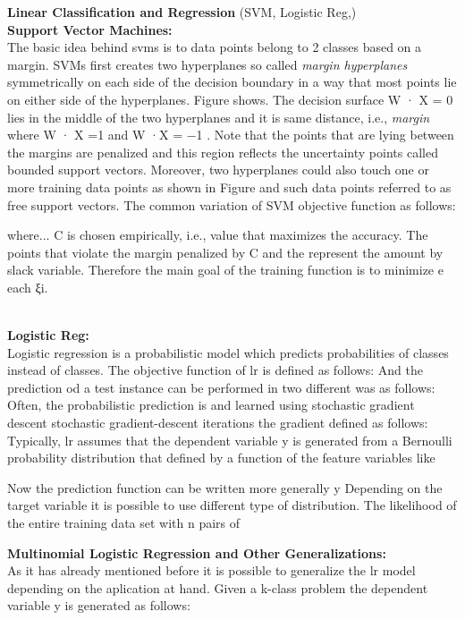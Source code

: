 \textbf{Linear Classification and Regression} (SVM, Logistic Reg,)\\
\textbf{Support Vector Machines:}\\
The basic idea behind svms is to data points belong to 2 classes based on a margin. SVMs first creates two hyperplanes so called \textit{margin hyperplanes} symmetrically on each side of the decision boundary in a way that most points lie on either side of the hyperplanes. Figure shows. 
The decision surface W · X = 0 lies in the middle of the two hyperplanes and it is same distance, i.e., \textit{margin} where W · X =1 and W ·X = −1 . Note that the points that are lying between the margins are penalized and this region reflects the uncertainty points called bounded support vectors. Moreover, two hyperplanes could also touch one or more training data points as shown in Figure and such data points referred to as free support vectors.
The common variation of SVM objective function as follows:

where...
C is chosen empirically, i.e.,  value that maximizes the accuracy. The points that violate the margin penalized by C and the represent the amount by slack variable. Therefore the main goal of the training function is to minimize  e each ξi. 


\\
\textbf{Logistic Reg:}\\
Logistic regression is a probabilistic model which predicts probabilities of classes instead of classes.
The objective function of lr is defined as follows:
And the prediction od a test instance can be performed in two different was as follows:
Often, the probabilistic prediction is and  learned using stochastic gradient descent
stochastic gradient-descent iterations the gradient defined as follows:
Typically, lr assumes that the dependent variable y is generated from a Bernoulli probability distribution that defined by a function of the feature variables like 

Now the prediction function can be written more generally y
Depending on the target variable it is possible to use different type of distribution.
The likelihood of the entire training data set with n pairs of

\textbf{Multinomial Logistic Regression and Other Generalizations:}\\
As it has already mentioned before it is possible to generalize the lr model depending on the aplication at hand. Given a k-class problem the dependent variable y is generated as follows:

